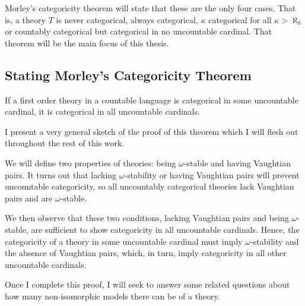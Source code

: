 Morley's categoricity theorem will state that these are the only four cases.
That is, a theory \(T\) is never categorical, always categorical, \(\kappa\) categorical for all \(\kappa > \aleph_0\) or countably categorical but categorical in no uncountable cardinal.  
That theorem will be the main focus of this thesis. 

\subsection{Stating Morley's Categoricity Theorem}

\begin{theorem}\label{theorem_morleys_categoricity}
If a first order theory in a countable language is categorical in some uncountable cardinal, it is categorical in all uncountable cardinals. 
\end{theorem}

I present a very general sketch of the proof of this theorem which I will flesh out throughout the rest of this work. 

We will define two properties of theories: being \(\omega\)-stable and having Vaughtian pairs. 
It turns out that lacking \(\omega\)-stability or having Vaughtian pairs will prevent uncountable categoricity, so all uncountably categorical theories lack Vaughtian pairs and are \(\omega\)-stable. 

We then observe that these two conditions, lacking Vaughtian pairs and being \(\omega\)-stable, are sufficient to show categoricity in all uncountable cardinals. 
Hence, the categoricity of a theory in some uncountable cardinal must imply \(\omega\)-stability and the absence of Vaughtian pairs, which, in turn, imply categoricity in all other uncountable cardinals.

Once I complete this proof, I will seek to answer some related questions about how many non-isomorphic models there can be of a theory. 

